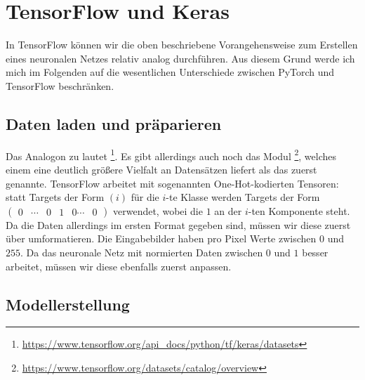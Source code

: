 \newpage



\section{TensorFlow und Keras}

In TensorFlow können wir die oben beschriebene Vorangehensweise zum Erstellen eines neuronalen Netzes 
relativ analog durchführen. Aus diesem Grund werde ich mich im Folgenden auf die wesentlichen 
Unterschiede zwischen PyTorch und TensorFlow beschränken. 

\subsection{Daten laden und präparieren}


Das Analogon zu  lautet 
\footnote{\url{https://www.tensorflow.org/api_docs/python/tf/keras/datasets}}. 
Es gibt allerdings auch noch das Modul \footnote{\url{https://www.tensorflow.org/datasets/catalog/overview}}, 
welches einem eine deutlich größere Vielfalt an Datensätzen liefert als das zuerst genannte.
TensorFlow arbeitet mit sogenannten One-Hot-kodierten Tensoren: statt Targets der Form 
\((i)\) für die \(i\)-te Klasse werden Targets der Form \(\begin{pmatrix}
    0 & \cdots & 0 & 1 & 0 \cdots & 0
\end{pmatrix}\) verwendet, wobei die \(1\) an der \(i\)-ten Komponente steht. 
Da die Daten allerdings im ersten Format gegeben sind, müssen wir diese zuerst über  umformatieren. 
Die Eingabebilder haben pro Pixel Werte zwischen \(0\) und \(255\). 
Da das neuronale Netz mit normierten Daten zwischen \(0\) und \(1\) besser arbeitet, 
müssen wir diese ebenfalls zuerst anpassen. 

\newpage

\subsection{Modellerstellung}

